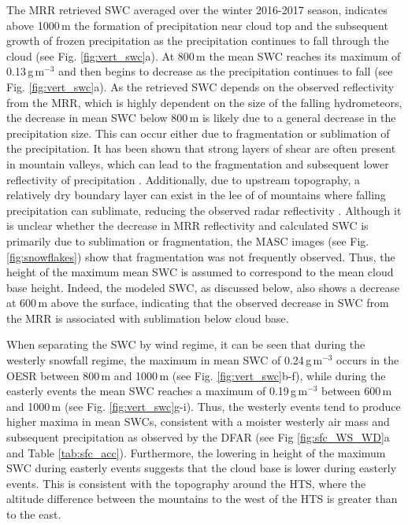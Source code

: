 \documentclass{ametsocV5}
\begin{document}
        The MRR retrieved SWC averaged over the winter 2016-2017 season, indicates above 1000\,m the formation of precipitation near cloud top and the subsequent growth of frozen precipitation as the precipitation continues to fall through the cloud (see Fig. \ref{fig:vert_swc}a). At 800\,m the mean SWC reaches its maximum of 0.13\,g\,m$^{-3}$ and then begins to decrease as the precipitation continues to fall (see Fig. \ref{fig:vert_swc}a). As the retrieved SWC depends on the observed reflectivity from the MRR, which is highly dependent on the size of the falling hydrometeors, the decrease in mean SWC below 800\,m is likely due to a general decrease in the precipitation size. This can occur either due to fragmentation or sublimation of the precipitation. It has been shown that strong layers of shear are often present in mountain valleys, which can lead to the fragmentation and subsequent lower reflectivity of precipitation \citep{ramelli_influence_2020}. Additionally, due to upstream topography, a relatively dry boundary layer can exist in the lee of of mountains where falling precipitation can sublimate, reducing the observed radar reflectivity \citep[e.g.][]{ramelli_microphysical_2020}. Although it is unclear whether the decrease in MRR reflectivity and calculated SWC is primarily due to sublimation or fragmentation, the MASC images (see Fig. \ref{fig:snowflakes}) show that fragmentation was not frequently observed. Thus, the height of the maximum mean SWC is assumed to correspond to the mean cloud base height. Indeed, the modeled SWC, as discussed below, also shows a decrease at 600\,m above the surface, indicating that the observed decrease in SWC from the MRR is associated with sublimation below cloud base.
        
        When separating the SWC by wind regime, it can be seen that during the westerly snowfall regime, the maximum in mean SWC of 0.24\,g\,m$^{-3}$ occurs in the OESR between 800\,m and 1000\,m (see Fig. \ref{fig:vert_swc}b-f), while during the easterly events the mean SWC reaches a maximum of 0.19\,g\,m$^{-3}$ between 600\,m and 1000\,m (see Fig. \ref{fig:vert_swc}g-i). Thus, the westerly events tend to produce higher maxima in mean SWCs, consistent with a moister westerly air mass and subsequent precipitation as observed by the DFAR (see Fig \ref{fig:sfc_WS_WD}a and Table \ref{tab:sfc_acc}). Furthermore, the lowering in height of the maximum SWC during easterly events suggests that the cloud base is lower during easterly events. This is consistent with the topography around the HTS, where the altitude difference between the mountains to the west of the HTS is greater than to the east.
        
\end{document}
